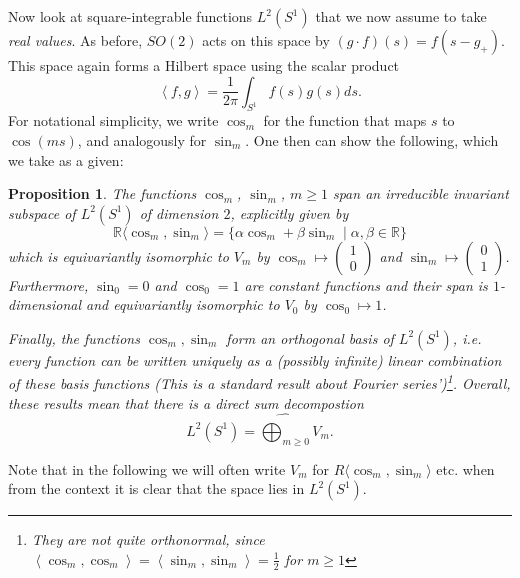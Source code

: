 \documentclass[12pt, a4paper]{article}
\theoremstyle{plain}
\newtheorem{pro}{Proposition}[section]
\theoremstyle{definition}
\theoremstyle{remark}
\newcommand{\R}{\mathds{R}}
\begin{document}
Now look at square-integrable functions $L^2(S^1)$ that we now assume to take \emph{real values}. As before, $SO(2)$ acts on this space by $(g \cdot f)(s) = f(s - g_{+})$. This space again forms a Hilbert space using the scalar product
\begin{equation*}
\left\langle f, g\right\rangle = \frac{1}{2 \pi} \int_{S^1} f(s) g(s) ds.
\end{equation*}
For notational simplicity, we write $\cos_m$ for the function that maps $s$ to $\cos(ms)$, and analogously for $\sin_m$. One then can show the following, which we take as a given:

\begin{pro}\label{description_L_1}
The functions $\cos_m$, $\sin_m$, $m \geq 1$ span an irreducible invariant subspace of $L^2(S^1)$ of dimension $2$, explicitly given by
\begin{equation*}
\R\langle \cos_m, \sin_m \rangle = \{\alpha \cos_m + \beta \sin_m \mid \alpha, \beta \in \R \}
\end{equation*}
which is equivariantly isomorphic to $V_m$ by $\cos_m \mapsto \begin{pmatrix} 1 \\ 0\end{pmatrix}$ and $\sin_m \mapsto \begin{pmatrix} 0 \\ 1 \end{pmatrix}$. Furthermore, $\sin_0 = 0$ and $\cos_0 = 1$ are constant functions and their span is $1$-dimensional and equivariantly isomorphic to $V_0$ by $\cos_0 \mapsto 1$. 

Finally, the functions $\cos_m, \sin_m$ form an orthogonal basis of $L^2(S^1)$, i.e. every function can be written uniquely as a (possibly infinite) linear combination of these basis functions (This is a standard result about Fourier series')\footnote{They are \emph{not quite} orthonormal, since $\left\langle \cos_m, \cos_m \right\rangle = \left\langle \sin_m, \sin_m\right\rangle = \frac{1}{2}$ for $m \geq 1$}. Overall, these results mean that there is a direct sum decompostion
\begin{equation*}
L^2(S^1) = \widehat{\bigoplus_{m \geq 0}} V_m.
\end{equation*}
\end{pro}

Note that in the following we will often write $V_m$ for $R \langle \cos_m, \sin_m \rangle$ etc. when from the context it is clear that the space lies in $L^2(S^1)$.
\end{document}
